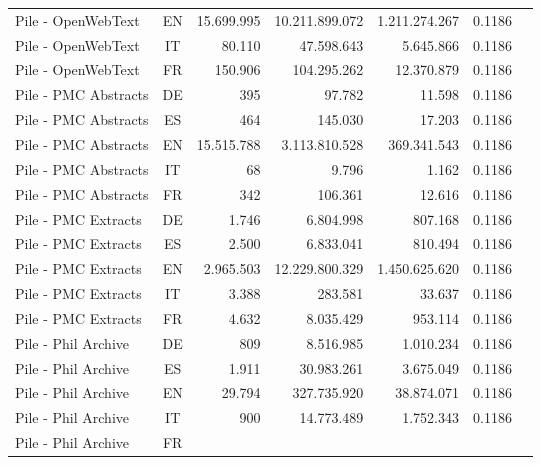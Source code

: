\begin{table*}[tbh]
\begin{minipage}{0.9\textwidth}
\begin{tabular}{lcrrrrr}
\\
Pile - OpenWebText  & EN %
& 15.699.995 & 10.211.899.072 %
& 1.211.274.267 & 0.1186
\\
Pile - OpenWebText  & IT %
& 80.110 & 47.598.643 %
& 5.645.866 & 0.1186
\\
Pile - OpenWebText & FR %
& 150.906 & 104.295.262 %
& 12.370.879 & 0.1186
\\
Pile - PMC Abstracts & DE %
& 395 & 97.782 %
& 11.598 & 0.1186
\\
Pile - PMC Abstracts  & ES %
& 464 & 145.030 %
& 17.203 & 0.1186
\\
Pile - PMC Abstracts & EN %
& 15.515.788 & 3.113.810.528 %
& 369.341.543 & 0.1186
\\
Pile - PMC Abstracts & IT %
& 68 & 9.796 %
& 1.162 & 0.1186
\\
Pile - PMC Abstracts & FR %
& 342 & 106.361 %
& 12.616 & 0.1186
\\
Pile - PMC Extracts & DE %
& 1.746 & 6.804.998 %
& 807.168 & 0.1186
\\
Pile - PMC Extracts & ES %
& 2.500 & 6.833.041 %
& 810.494 & 0.1186
\\
Pile - PMC Extracts & EN %
& 2.965.503 & 12.229.800.329 %
& 1.450.625.620 & 0.1186
\\
Pile - PMC Extracts & IT %
& 3.388 & 283.581 %
& 33.637 & 0.1186
\\
Pile - PMC Extracts & FR %
& 4.632 & 8.035.429 %
& 953.114 & 0.1186
\\
Pile - Phil Archive & DE %
& 809 & 8.516.985 %
& 1.010.234 & 0.1186
\\
Pile - Phil Archive & ES %
& 1.911 & 30.983.261 %
& 3.675.049 & 0.1186
\\
Pile - Phil Archive & EN %
& 29.794 & 327.735.920 %
& 38.874.071 & 0.1186
\\
Pile - Phil Archive & IT %
& 900 & 14.773.489 %
& 1.752.343 & 0.1186
\\
Pile - Phil Archive & FR %

\end{tabular}
\end{minipage}
\end{table*}
